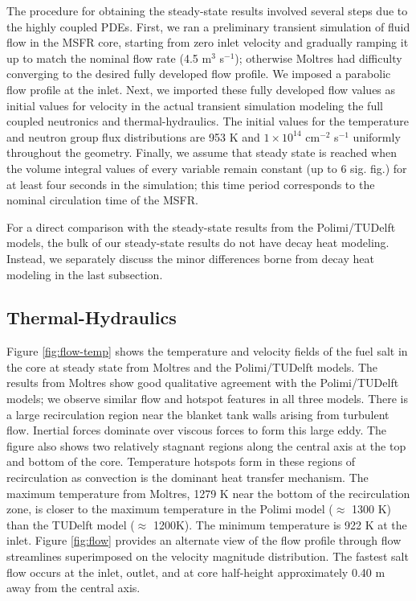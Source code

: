 The procedure for obtaining the steady-state results involved several steps
due to the highly coupled \glspl{PDE}. First, we ran a preliminary transient
simulation of fluid flow in the \gls{MSFR} core, starting from zero inlet
velocity and gradually ramping it up to match the nominal flow rate (4.5 m$^3$
s$^{-1}$); otherwise Moltres had difficulty converging to the desired fully
developed flow profile. We imposed a parabolic flow profile at the inlet.
Next, we imported these fully developed flow values as initial values for
velocity in the actual transient simulation modeling the full coupled
neutronics and thermal-hydraulics. The initial values for the temperature and
neutron group flux distributions are 953 K and $1 \times 10^{14}$ cm$^{-2}$
s$^{-1}$ uniformly throughout the geometry. Finally, we assume that steady
state is reached when the volume integral values of every variable remain
constant (up to 6 sig. fig.) for at least four seconds in the simulation; this
time period corresponds to the nominal circulation time of the \gls{MSFR}.

For a direct comparison with the steady-state results from the Polimi/TUDelft
models, the bulk of our steady-state results do not have decay heat modeling.
Instead, we separately discuss the minor differences borne from decay heat
modeling in the last subsection.

\subsection{Thermal-Hydraulics}

Figure \ref{fig:flow-temp} shows the temperature and velocity fields
of the fuel salt in the core at steady state from Moltres and the
Polimi/TUDelft models. The results from Moltres show good qualitative
agreement with the Polimi/TUDelft models; we observe similar flow and hotspot
features in all three models. There is a large recirculation region near the
blanket tank walls arising from turbulent flow. Inertial forces dominate over
viscous forces to form this large eddy. The figure also shows two relatively
stagnant regions along the central axis at the top and bottom of the core.
Temperature hotspots form in these regions of recirculation as convection is
the dominant heat transfer mechanism. The maximum temperature from Moltres,
1279 K near the bottom of the recirculation zone, is closer to the maximum
temperature in the Polimi model ($\approx$ 1300 K) than the TUDelft model
($\approx$ 1200K). The minimum temperature is 922 K at the inlet. Figure
\ref{fig:flow} provides an alternate view of the flow profile through flow
streamlines superimposed on the velocity magnitude distribution. The fastest
salt flow occurs at the inlet, outlet, and at core half-height approximately
0.40 m away from the central axis.

